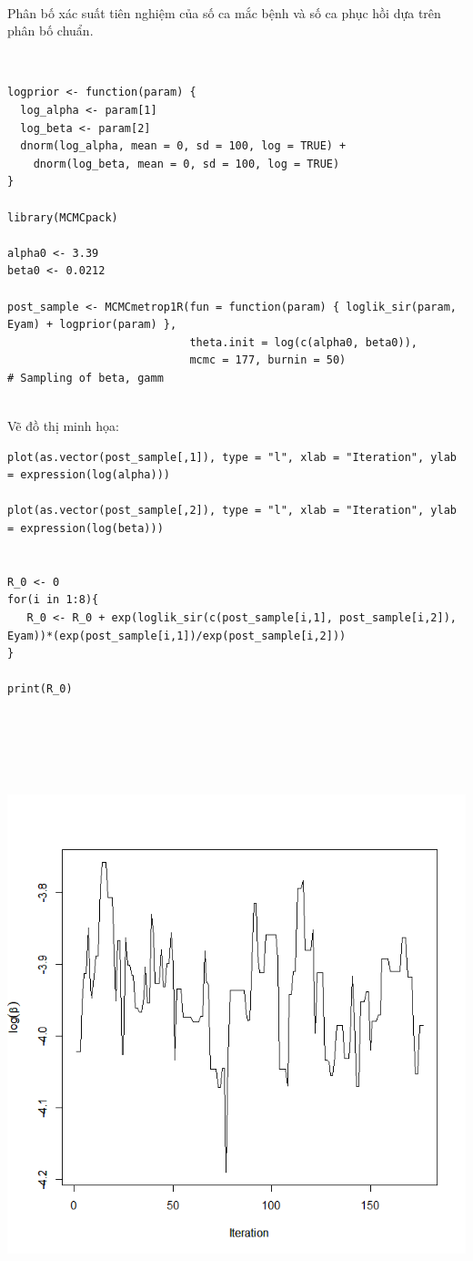 \documentclass[a4paper]{article}
\begin{document}
\\
Phân bố xác suất tiên nghiệm của số ca mắc bệnh và số ca phục hồi dựa trên phân bố chuẩn.

\\
\begin{lstlisting}
logprior <- function(param) { 
  log_alpha <- param[1]
  log_beta <- param[2]
  dnorm(log_alpha, mean = 0, sd = 100, log = TRUE) +
    dnorm(log_beta, mean = 0, sd = 100, log = TRUE)
}

library(MCMCpack)

alpha0 <- 3.39
beta0 <- 0.0212

post_sample <- MCMCmetrop1R(fun = function(param) { loglik_sir(param, Eyam) + logprior(param) },
                            theta.init = log(c(alpha0, beta0)),
                            mcmc = 177, burnin = 50)
# Sampling of beta, gamm

\end{lstlisting}
\\
Vẽ đồ thị minh họa:
\\
\begin{lstlisting}
plot(as.vector(post_sample[,1]), type = "l", xlab = "Iteration", ylab = expression(log(alpha)))

plot(as.vector(post_sample[,2]), type = "l", xlab = "Iteration", ylab = expression(log(beta)))


R_0 <- 0 
for(i in 1:8){
   R_0 <- R_0 + exp(loglik_sir(c(post_sample[i,1], post_sample[i,2]), Eyam))*(exp(post_sample[i,1])/exp(post_sample[i,2]))
}

print(R_0)




\end{lstlisting}

\\


\begin{center}
\includegraphics[scale=.5]{Images/Sir1.png}

\end{center}
\end{document}
